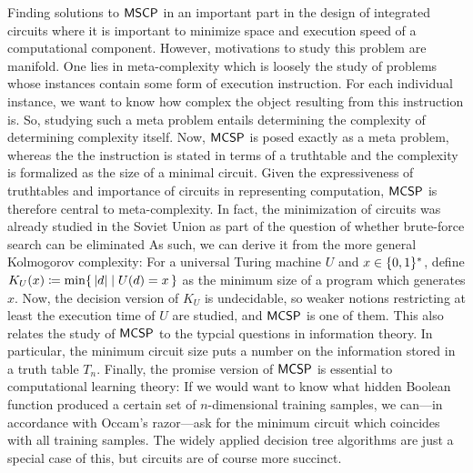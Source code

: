 \documentclass[11pt]{article}
\begin{document}
Finding solutions to $\mathsf{MSCP}$ in an important part in the design
of integrated circuits where it is important to minimize space and execution
speed of a computational component.
However, motivations to study this problem are manifold.
%
One lies in meta-complexity which is loosely the study of problems whose
instances contain some form of execution instruction.
For each individual instance, we want to know how complex the object resulting
from this instruction is.
So, studying such a meta problem entails determining the complexity of
determining complexity itself.
Now, $\mathsf{MCSP}$ is posed exactly as a meta problem, whereas the
the instruction is stated in terms of a truthtable and the complexity is
formalized as the size of a minimal circuit.
Given the expressiveness of truthtables and importance of circuits in
representing computation, $\mathsf{MCSP}$ is therefore central to
meta-complexity.
%
In fact, the minimization of circuits was already studied in the Soviet Union
as part of the question of whether brute-force search can be eliminated
\cite{trakhtenbrot84}
%
As such, we can derive it from the more general Kolmogorov complexity:
For a universal Turing machine $U$ and $x \in \{0,1\}^*$, define
$K_U(x) \coloneqq \min \{\, { |d| \mid U(d) = x } \,\}$
as the minimum size of a program which generates $x$.
Now, the decision version of $K_U$ is undecidable, so weaker notions
restricting at least the execution time of $U$ are studied, and
$\mathsf{MCSP}$ is one of them.
%
This also relates the study of $\mathsf{MCSP}$ to the typcial questions in
information theory. In particular, the minimum circuit size puts a number on
the information stored in a truth table $T_n$.
%
Finally, the promise version of $\mathsf{MCSP}$ is essential to computational
learning theory:
If we would want to know what hidden Boolean function produced a certain set of
$n$-dimensional training samples, we can---in accordance with Occam's
razor---ask for the minimum circuit which coincides with all training samples.
The widely applied decision tree algorithms are just a special case of this,
but circuits are of course more succinct.

\bigskip
\end{document}

